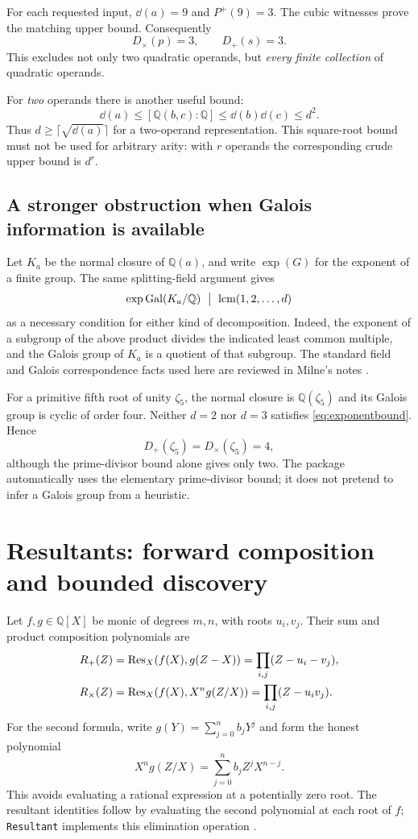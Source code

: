 \documentclass[11pt,a4paper]{article}
\theoremstyle{definition}\newtheorem{definition}[theorem]{Definition}
\theoremstyle{remark}\newtheorem{remark}[theorem]{Remark}
\newcommand{\Q}{\mathbb Q}\newcommand{\C}{\mathbb C}\newcommand{\Z}{\mathbb Z}
\newcommand{\Gal}{\operatorname{Gal}}\newcommand{\Tr}{\operatorname{Tr}}
\newcommand{\Dsum}{D_{+}}\newcommand{\Dprod}{D_{\times}}\newcommand{\Dtwo}{D_{\times,2}}
\newcommand{\wl}[1]{\texttt{#1}}
\begin{document}
For each requested input, $\dd(a)=9$ and $P^+(9)=3$. The cubic witnesses prove the matching upper bound. Consequently
\begin{equation}
 \boxed{\Dprod(p)=3,\qquad \Dsum(s)=3.}
 \label{eq:optimalexamples}
\end{equation}
This excludes not only two quadratic operands, but \emph{every finite collection} of quadratic operands.

For \emph{two} operands there is another useful bound:
\[
 \dd(a)\le[\Q(b,c):\Q]\le\dd(b)\dd(c)\le d^2.
\]
Thus $d\ge\lceil\sqrt{\dd(a)}\rceil$ for a two-operand representation. This square-root bound must not be used for arbitrary arity: with $r$ operands the corresponding crude upper bound is $d^r$.

\subsection{A stronger obstruction when Galois information is available}
Let $K_a$ be the normal closure of $\Q(a)$, and write $\exp(G)$ for the exponent of a finite group. The same splitting-field argument gives
\begin{equation}
 \exp\Gal(K_a/\Q)\ \bigm|\ \operatorname{lcm}(1,2,\ldots,d)
 \label{eq:exponentbound}
\end{equation}
as a necessary condition for either kind of decomposition. Indeed, the exponent of a subgroup of the above product divides the indicated least common multiple, and the Galois group of $K_a$ is a quotient of that subgroup. The standard field and Galois correspondence facts used here are reviewed in Milne's notes \cite{milne}.

For a primitive fifth root of unity $\zeta_5$, the normal closure is $\Q(\zeta_5)$ and its Galois group is cyclic of order four. Neither $d=2$ nor $d=3$ satisfies \eqref{eq:exponentbound}. Hence
\[
 \Dsum(\zeta_5)=\Dprod(\zeta_5)=4,
\]
although the prime-divisor bound alone gives only two. The package automatically uses the elementary prime-divisor bound; it does not pretend to infer a Galois group from a heuristic.

\section{Resultants: forward composition and bounded discovery}
\label{sec:resultants}
Let $f,g\in\Q[X]$ be monic of degrees $m,n$, with roots $u_i,v_j$. Their sum and product composition polynomials are
\begin{align}
 R_+(Z)&=\operatorname{Res}_X(f(X),g(Z-X))
       =\prod_{i,j}(Z-u_i-v_j),\label{eq:sumresultant}\\
 R_\times(Z)&=\operatorname{Res}_X(f(X),X^n g(Z/X))
       =\prod_{i,j}(Z-u_i v_j).\label{eq:prodresultant}
\end{align}
For the second formula, write $g(Y)=\sum_{j=0}^n b_jY^j$ and form the honest polynomial
\[
 X^n g(Z/X)=\sum_{j=0}^n b_j Z^jX^{n-j}.
\]
This avoids evaluating a rational expression at a potentially zero root. The resultant identities follow by evaluating the second polynomial at each root of $f$; \wl{Resultant} implements this elimination operation \cite{resultant}.
\end{document}
